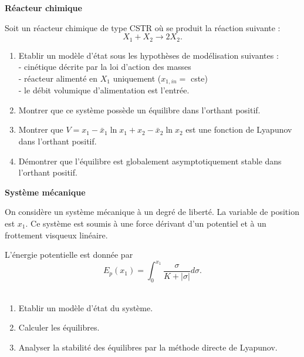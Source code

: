 \begin{exercice}{\bf Réacteur chimique}

Soit un réacteur chimique de type CSTR où se produit la réaction suivante
:
$$
X_1 + X_2 \longrightarrow 2X_2.
$$

\begin{enumerate}
\item Etablir un modèle d'état sous les hypothèses de modélisation suivantes
:\\
- cinétique décrite par la loi d'action des masses\\
- réacteur alimenté en $X_1$ uniquement ($x_{1,in} =$ cste)\\
- le débit volumique d'alimentation est l'entrée.
\item Montrer que ce système possède un équilibre dans l'orthant positif.
\item Montrer que $V = x_1-\bar x_1 \ln x_1+x_2-\bar x_2 \ln x_2$ est une
fonction de Lyapunov dans l'orthant positif.
\item Démontrer que l'équilibre est globalement asymptotiquement stable dans
l'orthant positif.
\end{enumerate}
\end{exercice}
\vv

\begin{exercice}{\bf Système mécanique}

On considère un système mécanique à un degré de liberté.  La variable de
position est $x_1$.  Ce système est soumis à une force dérivant d'un potentiel
et à un frottement visqueux linéaire.

L'énergie potentielle est donnée par $$E_p(x_1) = \int^{x_1}_0 \dfrac{\sigma}{K +
|\sigma|} d \sigma.$$\\

\begin{enumerate}
\item Etablir un modèle d'état du système.
\item Calculer les équilibres.
\item Analyser la stabilité des équilibres par la méthode directe de
Lyapunov.
\end{enumerate}
\end{exercice}
\vv

